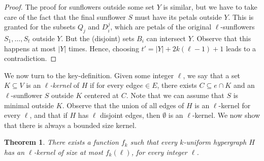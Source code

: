 \documentclass{article}
\newcommand{\hedge}{edge\xspace}
\newcommand{\hedges}{edges\xspace}
\newtheorem{theorem}{Theorem}
\begin{document}
\begin{proof}
The proof for sunflowers outside some set $Y$ is similar, but we have to take care of the fact that the final sunflower $S$ must have its petals outside $Y$. This is granted for the subsets $Q_j$ and $D_i^j$, which are petals of the original $\ell$-sunflowers $S_1,\dots ,S_t$ outside $Y$. But the (disjoint) sets $B_i$ can intersect $Y$. Observe that this happens at most $|Y|$ times. Hence, choosing $t'=|Y|+2k(\ell-1)+1$ leads to a contradiction.
\end{proof}





We now turn to the key-definition. Given some integer $\ell$, we say that a set $K\subseteq V$ is an \emph{$\ell$-kernel} of $H$ if for every \hedge $e\in E$, there exists $C\subseteq e\cap K$ and an $\ell$-sunflower $S$ outside $K$ centered at $C$. Note that we can assume that $S$ is minimal outside $K$. 
Observe that the union of all \hedges of $H$ is an $\ell$-kernel for every $\ell$, and that if $H$ has $\ell$ disjoint \hedges, then $\emptyset$ is an $\ell$-kernel. We now show that there is always a bounded size kernel.

\begin{theorem}\label{th:kernel}
There exists a function $f_k$ such that every $k$-uniform hypergraph $H$ has an $\ell$-kernel of size at most $f_k(\ell)$, for every integer $\ell$.
\end{theorem}
\end{document}
